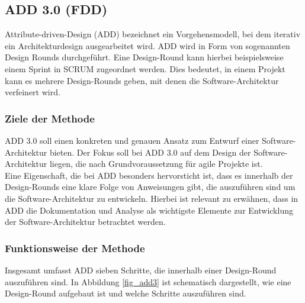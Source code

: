 \subsection{ADD 3.0 (FDD)}\label{add3}
Attribute-driven-Design (ADD) bezeichnet ein Vorgehensmodell, bei dem iterativ ein Architekturdesign ausgearbeitet wird. ADD wird in Form von sogenannten Design Rounds durchgef\"uhrt. Eine Design-Round kann hierbei beispielsweise einem Sprint in SCRUM zugeordnet werden. Dies bedeutet, in einem Projekt kann es mehrere Design-Rounds geben, mit denen die Software-Architektur verfeinert wird. \\

\subsubsection{Ziele der Methode}
ADD 3.0 soll einen konkreten und genauen Ansatz zum Entwurf einer Software-Architektur bieten. Der Fokus soll bei ADD 3.0 auf dem Design der Software-Architektur liegen, die nach \cite{Cer01} Grundvoraussetzung f\"ur agile Projekte ist.\\

Eine Eigenschaft, die bei ADD besonders hervorsticht ist, dass es innerhalb der Design-Rounds eine klare Folge von Anweisungen gibt, die auszuf\"uhren sind um die Software-Architektur zu entwickeln. Hierbei ist relevant zu erw\"ahnen, dass in ADD die Dokumentation und Analyse als wichtigste Elemente zur Entwicklung der Software-Architektur betrachtet werden. \\

\subsubsection{Funktionsweise der Methode}
Insgesamt umfasst ADD sieben Schritte, die innerhalb einer Design-Round auszuf\"uhren sind. In Abbildung \ref{fig_add3} ist schematisch dargestellt, wie eine Design-Round aufgebaut ist und welche Schritte auszuf\"uhren sind.\\

